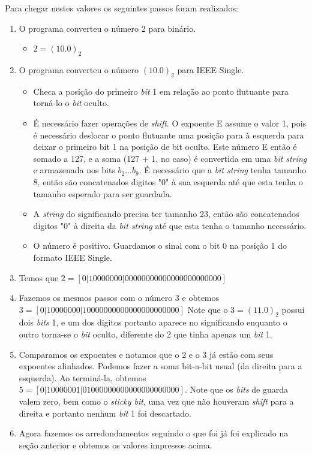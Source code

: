 \documentclass[11pt]{article}
\begin{document}
Para chegar nestes valores os seguintes passos foram realizados:
\begin{enumerate}
  \item O programa converteu o número 2 para binário.
    \begin{itemize}
      \item  $ 2 = (10.0)_2 $
    \end{itemize}
  \item O programa converteu o número $(10.0)_2$ para IEEE Single.
  \begin{itemize}
    \item Checa a posição do primeiro \textit{bit} 1 em relação ao ponto flutuante para torná-lo o \textit{bit} oculto.
    \item É necessário fazer operações de \textit{shift}. O expoente E assume o valor 1, pois é necessário deslocar o ponto flutuante uma posição para à esquerda para deixar o
    primeiro bit 1 na posição de bit oculto. Este número E então é somado a 127, e a soma (127 + 1, no caso)
    é convertida em uma \textit{bit string} e armazenada nos bits $b_2 ... b_9$. É necessário que a \textit{bit string} tenha tamanho 8, então são concatenados digitos "0"
    à sua esquerda até que esta tenha o tamanho esperado para ser guardada.
    \item A \textit{string} do significando precisa ter tamanho 23, então são concatenados digitos "0" à direita da \textit{bit string} até que esta tenha
    o tamanho necessário.
    \item O número é positivo. Guardamos o sinal com o bit 0 na posição 1 do formato IEEE Single.
  \end{itemize}
  \item Temos que {\small$2  = [ 0 | 1 0 0 0 0 0 0 0 | 0 0 0 0 0 0 0 0 0 0 0 0 0 0 0 0 0 0 0 0 0 0 0 ] $}
  \item Fazemos os mesmos passos com o número 3 e obtemos {\small$3  = [ 0 | 1 0 0 0 0 0 0 0 | 1 0 0 0 0 0 0 0 0 0 0 0 0 0 0 0 0 0 0 0 0 0 0 ] $} Note que o $3 = (11.0)_2$ possui dois \textit{bits} 1,
  e um dos digitos portanto aparece no significando enquanto o outro torna-se o \textit{bit} oculto, diferente do 2 que tinha apenas um \textit{bit} 1.
  \item Comparamos os expoentes e notamos que o 2 e o 3 já estão com seus expoentes alinhados. Podemos fazer a soma bit-a-bit usual (da direita para a esquerda). Ao terminá-la, obtemos
  {\small$5 = [ 0 | 1 0 0 0 0 0 0 1 | 0 1 0 0 0 0 0 0 0 0 0 0 0 0 0 0 0 0 0 0 0 0 0 ] $}. Note que os \textit{bits} de guarda valem zero, bem como o \textit{sticky bit}, uma vez que não houveram \textit{shift} para a direita
  e portanto nenhum \textit{bit} 1 foi descartado.
  \item Agora fazemos os arredondamentos seguindo o que foi já foi explicado na seção anterior e obtemos os valores impressos acima.
\end{enumerate}
\end{document}
